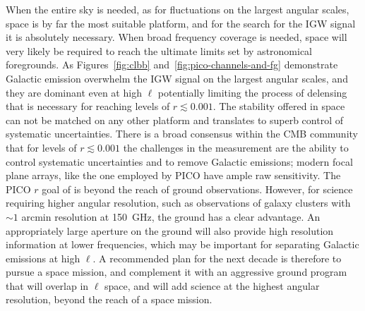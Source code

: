 \documentclass[PICOReport.tex]{subfiles}
\begin{document}
When the entire sky is needed, as for fluctuations on the largest angular scales, space is by far the most suitable platform, and for the search for the \ac{IGW} signal it is absolutely necessary. When broad frequency coverage is needed, space will very likely be required to reach the ultimate limits set by astronomical foregrounds.  As Figures~\ref{fig:clbb} and~\ref{fig:pico-channels-and-fg} demonstrate Galactic emission overwhelm the \ac{IGW} signal on the largest angular scales, and they are dominant even at high $\ell$ potentially limiting the process of delensing that is necessary for reaching levels of $r\lesssim0.001$. The stability offered in space can not be matched on any other platform and translates to superb control of systematic uncertainties. There is a broad consensus within the CMB community that for levels of $r \lesssim 0.001$ the challenges in the measurement are the ability to control systematic uncertainties and to remove Galactic emissions; modern focal plane arrays, like the one employed by PICO have ample raw sensitivity. The PICO $r$ goal of  is beyond the reach of ground observations.  However, for science requiring higher angular resolution, such as observations of galaxy clusters with $\sim1$ arcmin resolution at 150~GHz, the ground has a clear advantage. An appropriately large aperture on the ground will also provide high resolution information at lower frequencies, which may be important for separating Galactic emissions at high $\ell$. 
A recommended plan for the next decade is therefore to pursue a space mission, and complement it with an aggressive ground program that will overlap in $\ell$ space, and will add science at the highest angular resolution, beyond the reach of a space mission. 

\end{document}
